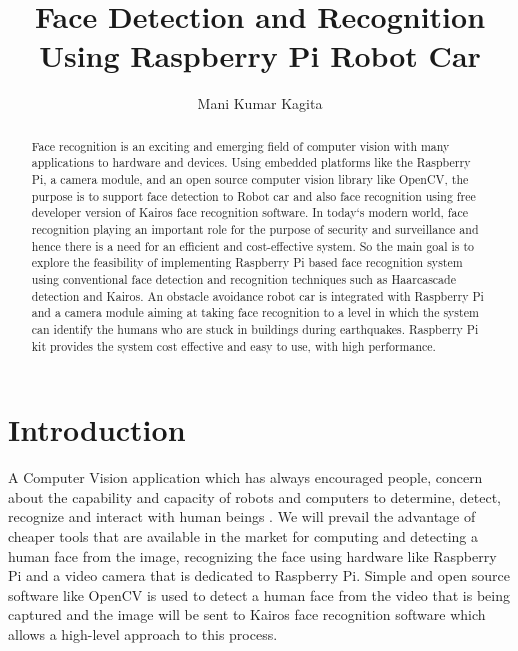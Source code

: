 \documentclass[sigconf]{acmart}
\begin{document}
\title{Face Detection and Recognition Using Raspberry Pi Robot Car}

\author{Mani Kumar Kagita}


\begin{abstract}
Face recognition is an exciting and emerging field of computer vision with many applications to hardware and devices. Using embedded platforms like the Raspberry Pi, a camera module, and an open source computer vision library like OpenCV, the purpose is to support face detection to Robot car and also face recognition using free developer version of Kairos face recognition software.
In today`s modern world, face recognition playing an important role for the purpose of security and surveillance and hence there is a need for an efficient and cost-effective system. So the main goal is to explore the feasibility of implementing Raspberry Pi based face recognition system using conventional face detection and recognition techniques such as Haarcascade detection and Kairos. An obstacle avoidance robot car is integrated with Raspberry Pi and a camera module aiming at taking face recognition to a level in which the system can identify the humans who are stuck in buildings during earthquakes.  Raspberry Pi kit provides the system cost effective and easy to use, with high performance.

\end{abstract}


\maketitle

\section{Introduction}
A Computer Vision application which has always encouraged people, concern about the capability and capacity of robots and computers to determine, detect, recognize and interact with human beings \cite{Boris2014}. We will prevail the advantage of cheaper tools that are available in the market for computing and detecting a human face from the image, recognizing the face using hardware like Raspberry Pi and a video camera that is dedicated to Raspberry Pi. Simple and open source software like OpenCV is used to detect a human face from the video that is being captured and the image will be sent to Kairos face recognition software which allows a high-level approach to this process.
\end{document}
